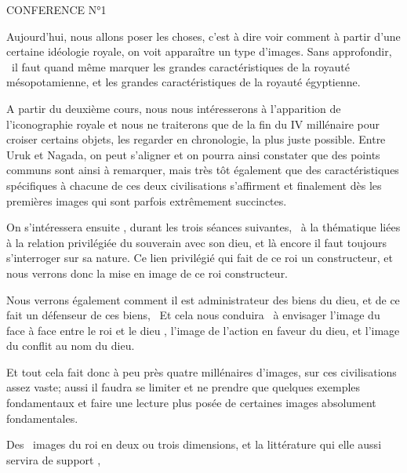 \documentclass[a4paper]{article}
\begin{document}
\bigskip


\bigskip


\bigskip

{
CONFERENCE N°1 \ }


\bigskip


\bigskip

{
Aujourd'hui, nous allons poser les choses, c'est à dire voir comment à
partir d'une certaine idéologie royale, on voit apparaître un type
d'images. Sans approfondir, \ il faut quand même marquer les grandes
caractéristiques de la royauté mésopotamienne, et les grandes
caractéristiques de la royauté égyptienne.}


\bigskip

{
A partir du deuxième cours, nous nous intéresserons à l'apparition de
l'iconographie royale et nous ne traiterons que de la fin du IV
millénaire pour croiser certains objets, les regarder en chronologie,
la plus juste possible. Entre Uruk et Nagada, on peut s'aligner et on
pourra ainsi constater que des points communs sont ainsi à remarquer,
mais très tôt également que des caractéristiques spécifiques à chacune
de ces deux civilisations s'affirment et finalement dès les premières
images qui sont parfois extrêmement succinctes.}


\bigskip

{
On s'intéressera ensuite , durant les trois séances suivantes, \ à la
thématique liées à la relation privilégiée du souverain avec son dieu,
et là encore il faut toujours s'interroger sur sa nature. Ce lien
privilégié qui fait de ce roi un constructeur, et nous verrons donc la
mise en image de ce roi constructeur.}

{
Nous verrons également comment il est administrateur des biens du dieu,
et de ce fait un défenseur de ces biens, \ Et cela nous conduira \ à
envisager l'image du face à face entre le roi et le dieu , l'image de
l'action en faveur du dieu, et l'image du conflit au nom du dieu.}


\bigskip

{
Et tout cela fait donc à peu près quatre millénaires d'images, sur ces
civilisations assez vaste; aussi il faudra se limiter et ne prendre que
quelques exemples fondamentaux et faire une lecture plus posée de
certaines images absolument fondamentales. }

{
Des \ images du roi en deux ou trois dimensions, et la littérature qui
elle aussi servira de support , }
\end{document}
